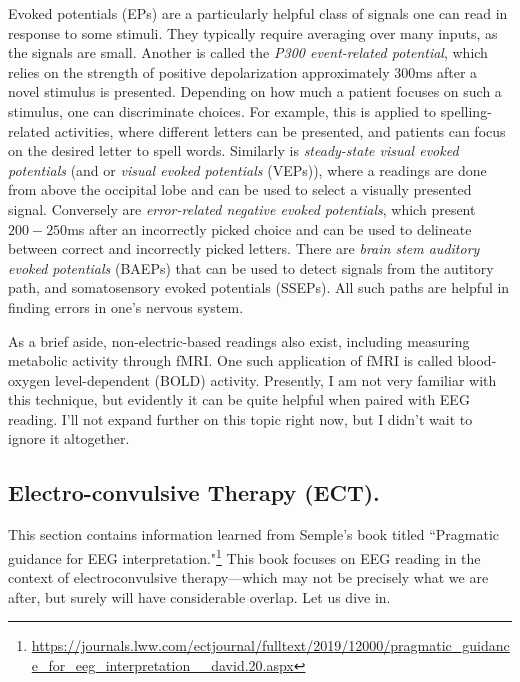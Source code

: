 Evoked potentials (EPs) are a particularly helpful class of signals one can read in response to some stimuli. They typically require averaging over many inputs, as the signals are small. Another is called the \textit{P300 event-related potential}, which relies on the strength of positive depolarization approximately 300ms after a novel stimulus is presented. Depending on how much a patient focuses on such a stimulus, one can discriminate choices. For example, this is applied to spelling-related activities, where different letters can be presented, and patients can focus on the desired letter to spell words. Similarly is \textit{steady-state visual evoked potentials} (and or \textit{visual evoked potentials} (VEPs)), where a readings are done from above the occipital lobe and can be used to select a visually presented signal. Conversely are \textit{error-related negative evoked potentials}, which present $200-250$ms after an incorrectly picked choice and can be used to delineate between correct and incorrectly picked letters. There are \textit{brain stem auditory evoked potentials} (BAEPs) that can be used to detect signals from the autitory path, and somatosensory evoked potentials (SSEPs). All such paths are helpful in finding errors in one's nervous system.\newline

As a brief aside, non-electric-based readings also exist, including measuring metabolic activity through fMRI. One such application of fMRI is called blood-oxygen level-dependent (BOLD) activity. Presently, I am not very familiar with this technique, but evidently it can be quite helpful when paired with EEG reading. I'll not expand further on this topic right now, but I didn't wait to ignore it altogether. 

\subsection{Electro-convulsive Therapy (ECT).}

This section contains information learned from Semple's book titled ``Pragmatic guidance for EEG interpretation."\footnote{\url{https://journals.lww.com/ectjournal/fulltext/2019/12000/pragmatic_guidance_for_eeg_interpretation__david.20.aspx}} This book focuses on EEG reading in the context of electroconvulsive therapy---which may not be precisely what we are after, but surely will have considerable overlap. Let us dive in.\newline

